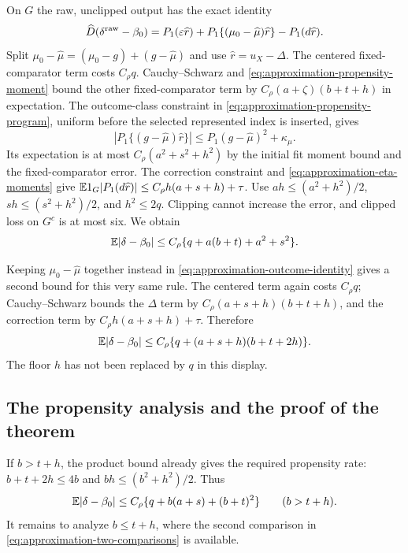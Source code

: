 On $G$ the raw, unclipped output has the exact identity
\begin{equation}
 \widehat D(\delta^{\rm raw}-\beta_0)
 =P_1(\varepsilon\widehat r)
  +P_1\{(\mu_0-\widehat\mu)\widehat r\}
  -P_1(d\widehat r).
 \label{eq:approximation-outcome-identity}
\end{equation}
Split $\mu_0-\widehat\mu=(\mu_0-g)+(g-\widehat\mu)$ and
use $\widehat r=u_X-\Delta$. The centered fixed-comparator term
costs $C_\rho q$. Cauchy--Schwarz and
\eqref{eq:approximation-propensity-moment} bound the other
fixed-comparator term by $C_\rho(a+\zeta)(b+t+h)$ in expectation.
The outcome-class constraint in
\eqref{eq:approximation-propensity-program}, uniform before the
selected represented index is inserted, gives
\[
 |P_1\{(g-\widehat\mu)\widehat r\}|
 \le P_1(g-\widehat\mu)^2+\kappa_\mu.
\]
Its expectation is at most $C_\rho(a^2+s^2+h^2)$ by the initial
fit moment bound and the fixed-comparator error. The correction
constraint and \eqref{eq:approximation-eta-moments} give
$\mathbb E1_G|P_1(d\widehat r)|\le C_\rho h(a+s+h)+\tau$.
Use $ah\le(a^2+h^2)/2$, $sh\le(s^2+h^2)/2$, and $h^2\le2q$.
Clipping cannot increase the error, and clipped loss on $G^c$ is at
most six. We obtain
\begin{equation}
 \mathbb E|\delta-\beta_0|
 \le C_\rho\{q+a(b+t)+a^2+s^2\}.
 \label{eq:approximation-outcome-rate}
\end{equation}

Keeping $\mu_0-\widehat\mu$ together instead in
\eqref{eq:approximation-outcome-identity} gives a second bound for
this very same rule. The centered term again costs $C_\rho q$;
Cauchy--Schwarz bounds the $\Delta$ term by
$C_\rho(a+s+h)(b+t+h)$, and the correction term by
$C_\rho h(a+s+h)+\tau$. Therefore
\begin{equation}
 \mathbb E|\delta-\beta_0|
 \le C_\rho\{q+(a+s+h)(b+t+2h)\}.
 \label{eq:approximation-product-rate}
\end{equation}
The floor $h$ has not been replaced by $q$ in this display.

\subsection{The propensity analysis and the proof of the theorem}
\label{app:approximation-propensity-bound}

If $b>t+h$, the product bound already gives the required propensity
rate: $b+t+2h\le4b$ and
$bh\le(b^2+h^2)/2$. Thus
\begin{equation}
 \mathbb E|\delta-\beta_0|
 \le C_\rho\{q+b(a+s)+(b+t)^2\}
 \qquad(b>t+h).
 \label{eq:approximation-propensity-large-b}
\end{equation}
It remains to analyze $b\le t+h$, where the second comparison in
\eqref{eq:approximation-two-comparisons} is available.

